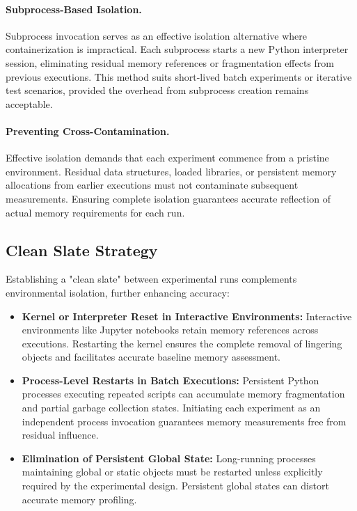 \paragraph{Subprocess-Based Isolation.}
Subprocess invocation serves as an effective isolation alternative where containerization is impractical.
Each subprocess starts a new Python interpreter session, eliminating residual memory references or fragmentation effects from previous executions.
This method suits short-lived batch experiments or iterative test scenarios, provided the overhead from subprocess creation remains acceptable.

\paragraph{Preventing Cross-Contamination.}
Effective isolation demands that each experiment commence from a pristine environment.
Residual data structures, loaded libraries, or persistent memory allocations from earlier executions must not contaminate subsequent measurements.
Ensuring complete isolation guarantees accurate reflection of actual memory requirements for each run.

\subsection{Clean Slate Strategy}
\label{subsec:mmc-bestpractices-clean-slate}

Establishing a "clean slate" between experimental runs complements environmental isolation, further enhancing accuracy:

\begin{itemize}

    \item \textbf{Kernel or Interpreter Reset in Interactive Environments:} Interactive environments like Jupyter notebooks retain memory references across executions.
    Restarting the kernel ensures the complete removal of lingering objects and facilitates accurate baseline memory assessment.

    \item \textbf{Process-Level Restarts in Batch Executions:} Persistent Python processes executing repeated scripts can accumulate memory fragmentation and partial garbage collection states. Initiating each experiment as an independent process invocation guarantees memory measurements free from residual influence.

    \item \textbf{Elimination of Persistent Global State:} Long-running processes maintaining global or static objects must be restarted unless explicitly required by the experimental design. Persistent global states can distort accurate memory profiling.

\end{itemize}

